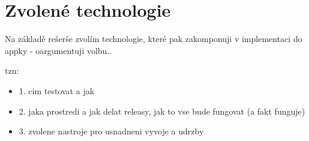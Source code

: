 \chapter{Zvolené technologie}

Na základě rešerše zvolím technologie, které pak zakomponuji v implementaci do appky - oargumentuji volbu..

tzn:

\begin{itemize}
\item 1. cim testovat a jak
\item 2. jaka prostredi a jak delat releasy, jak to vse bude fungovat (a fakt funguje)
\item 3. zvolene nastroje pro usnadneni vyvoje a udrzby
\end{itemize}